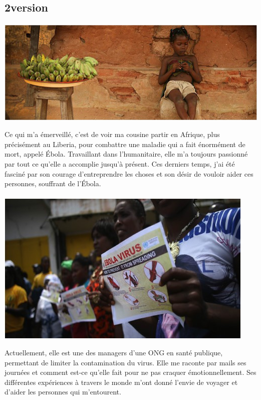 \subsection{2\ieme version}
\paragraph{}
\begin{center}
\includegraphics[scale=0.7]{Afrique.jpg}
\end{center}
Ce qui m'a émerveillé, c'est de voir ma cousine partir en Afrique, plus
précisément au Liberia, pour combattre une maladie qui a fait énormément de
mort, appelé Ébola.  Travaillant dans l'humanitaire, elle m'a toujours
passionné par tout ce qu'elle a accomplie jusqu'à présent. Ces derniers temps,
j'ai été fasciné par son courage d'entreprendre les choses et son désir de
vouloir aider ces personnes, souffrant de l’Ébola.

\paragraph{}
\begin{center}
\includegraphics[scale=0.7]{Afrique2.jpg}
\end{center}
Actuellement, elle est une des managers d'une ONG en santé publique, permettant
de limiter la contamination du virus. Elle me raconte par mails ses journées et
comment est-ce qu'elle fait pour ne pas craquer émotionnellement. Ses
différentes expériences à travers le monde m'ont donné l'envie de voyager et
d'aider les personnes qui m'entourent.

